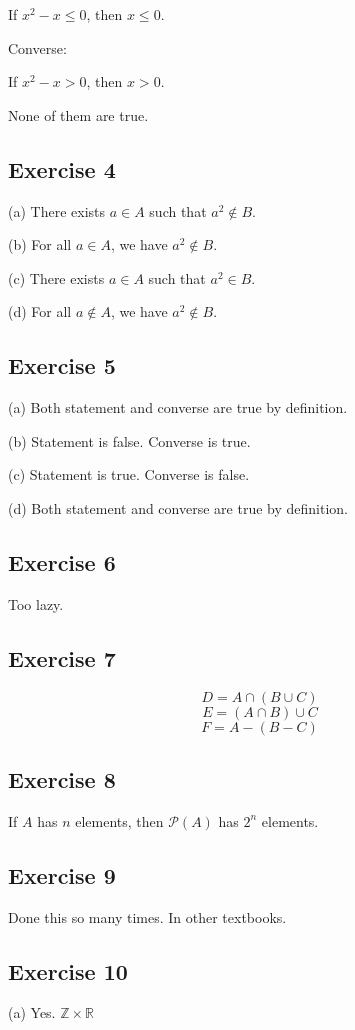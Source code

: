 \documentclass{book}
\begin{document}
If $x^2 - x \leq 0$, then $x \leq 0$.

\noindent
Converse:

If $x^2 - x > 0$, then $x > 0$.

\noindent
None of them are true.

\subsection*{Exercise 4}
(a)
There exists $a \in A$ such that $a^2 \not \in B$.

\noindent
(b)
For all $a \in A$, we have $a^2 \not \in B$.

\noindent
(c)
There exists $a \in A$ such that $a^2 \in B$.

\noindent
(d)
For all $a \not \in A$, we have $a^2 \not \in B$.

\subsection*{Exercise 5}
(a)
Both statement and converse are true by definition.

\noindent
(b)
Statement is false. Converse is true.

\noindent
(c)
Statement is true. Converse is false.

\noindent
(d)
Both statement and converse are true by definition.

\subsection*{Exercise 6}
Too lazy.

\subsection*{Exercise 7}
$$D = A \cap (B \cup C)$$
$$E = (A \cap B) \cup C$$
$$F = A - (B - C)$$

\subsection*{Exercise 8}
If $A$ has $n$ elements, then $\mathcal{P}(A)$ has $2^n$ elements.

\subsection*{Exercise 9}
Done this so many times. In other textbooks.

\subsection*{Exercise 10}
(a)
Yes. $\mathbb{Z} \times \mathbb{R}$
\end{document}
